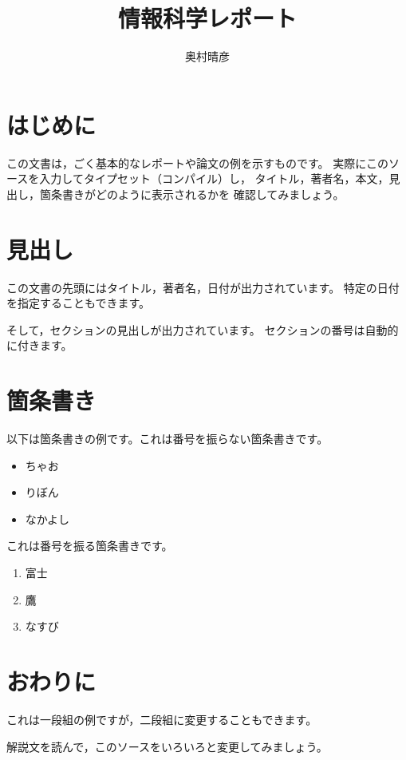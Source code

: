 \documentclass[twocolumn]{jsarticle}
\begin{document}
\title{情報科学レポート}
\author{奥村晴彦}
\maketitle

\section{はじめに}

この文書は，ごく基本的なレポートや論文の例を示すものです。
実際にこのソースを入力してタイプセット（コンパイル）し，
タイトル，著者名，本文，見出し，箇条書きがどのように表示されるかを
確認してみましょう。

\section{見出し}

この文書の先頭にはタイトル，著者名，日付が出力されています。
特定の日付を指定することもできます。

そして，セクションの見出しが出力されています。
セクションの番号は自動的に付きます。

\section{箇条書き}

以下は箇条書きの例です。これは番号を振らない箇条書きです。

\begin{itemize}
  \item ちゃお
  \item りぼん
  \item なかよし
\end{itemize}

これは番号を振る箇条書きです。

\begin{enumerate}
  \item 富士
  \item 鷹
  \item なすび
\end{enumerate}

\section{おわりに}

これは一段組の例ですが，二段組に変更することもできます。

解説文を読んで，このソースをいろいろと変更してみましょう。
\end{document}
